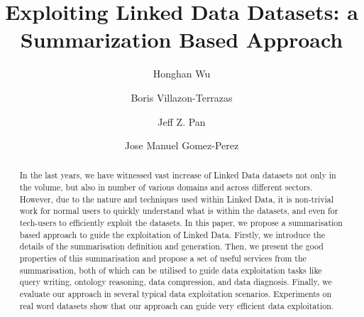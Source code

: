 \documentclass{llncs}
\begin{document}
%
\frontmatter          %
%
\pagestyle{headings}  %
%
%
\mainmatter              %
%
\title{Exploiting Linked Data Datasets: a Summarization Based Approach}

%
%
\author{Honghan Wu \and Boris Villazon-Terrazas \and Jeff Z. Pan \and Jose Manuel Gomez-Perez}
%
%
%


\maketitle              %



\begin{abstract}
In the last years, we have witnessed vast increase of Linked Data datasets not only in the volume, but also in number of various domains and across different sectors. However, due to the nature and techniques used within Linked Data, it is non-trivial work for normal users to quickly understand what is within the datasets, and even for tech-users to efficiently exploit the datasets. In this paper, we propose a summarisation based approach to guide the exploitation of Linked Data. Firstly, we introduce the details of the summarisation definition and generation. Then, we present the good properties of this summarisation and propose a set of useful services from the summarisation, both of which can be utilised to guide data exploitation tasks like query writing, ontology reasoning, data compression, and data diagnosis. Finally, we evaluate our approach in several typical data exploitation scenarios. Experiments on real word datasets show that our approach can guide very efficient data exploitation.
\end{abstract}
\end{document}
